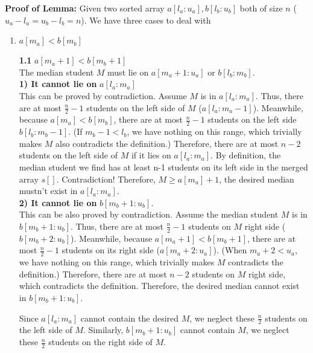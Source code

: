 \documentclass{article}
\begin{document}
\textbf{Proof of Lemma:} 
Given two sorted array $a[l_a: u_a], b[l_b:u_b]$ both of size $n$ ($u_a-l_a = u_b-l_b=n$). We have three cases to deal with \begin{enumerate}
    \item $a[m_a] < b[m_b]$ 
     
            \textbf{1.1} \textbf{$a[m_a+1]<b[m_b+1]$}\\
            The median student $M$ must lie on $a[m_a+1:u_a]$ or $b[l_b:m_b]$.
            \\\textbf{1) It cannot lie on }$a[l_a:m_a]$\\
             This can be proved by contradiction. Assume $M$ is in $a[l_a:m_a]$. Thus, there are at most $\frac{n}{2}-1$ students on the left side of $M$ ($a[l_a:m_a-1]$). Meanwhile, because $a[m_a]<b[m_b]$, there are at most $\frac{n}{2}-1$ students on the left side  $b[l_b:m_b-1]$. (If $m_b-1 < l_b$, we have nothing on this range, which trivially makes $M$ also contradicts the definition.) Therefore, there are at most $n-2$ students on the left side of $M$ if it lies on $a[l_a:m_a]$. By definition, the median student we find has at least n-1 students on its left side in the merged array $s[]$. Contradiction! Therefore, $M \geq a[m_a]+1$, the desired median mustn't exist in $a[l_a:m_a]$. 
            \\\textbf{2) It cannot lie on} $b[m_b+1: u_b]$.\\
            This can be also proved by contradiction. Assume the median student $M$ is in $b[m_b+1: u_b]$. Thus, there are at most $\frac{n}{2}-1$ students on $M$ right side ($b[m_b+2: u_b]$). Meanwhile, because $a[m_a+1] < b[m_b+1]$, there are at most $\frac{n}{2}-1$ students on its right side ($a[m_a+2:u_a]$). (When $m_a+2 < u_a$, we have nothing on this range, which trivially makes $M$ contradicts the definition.) Therefore, there are at most $n-2$ students on $M$ right side, which contradicts the definition. Therefore, the desired median cannot exist in $b[m_b+1:u_b]$.
        
            Since $a[l_a:m_a]$ cannot contain the desired $M$, we neglect these $\frac{n}{2}$ students on the left side of $M$. Similarly, $b[m_b+1:u_b]$ cannot contain $M$, we neglect these $\frac{n}{2}$ students on the right side of $M$.


\end{enumerate}
\end{document}
